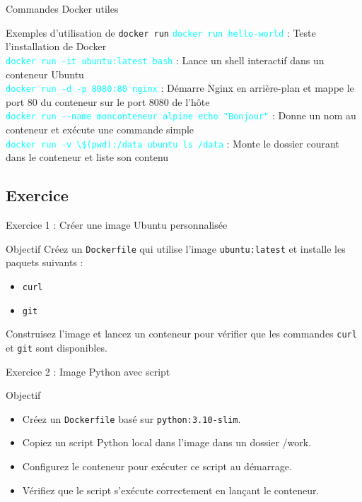 \documentclass{beamer}
\begin{document}
\begin{frame}[fragile]{Commandes Docker utiles}
\begin{block}{Exemples d'utilisation de \texttt{docker run}}
\textcolor{cyan}{\verb?docker run hello-world?} : Teste l'installation de Docker \\
\textcolor{cyan}{\verb?docker run -it ubuntu:latest bash?} : Lance un shell interactif dans un conteneur Ubuntu \\
\textcolor{cyan}{\verb?docker run -d -p 8080:80 nginx?} : Démarre Nginx en arrière-plan et mappe le port 80 du conteneur sur le port 8080 de l'hôte \\
\textcolor{cyan}{\verb?docker run --name monconteneur alpine echo "Bonjour"?} : Donne un nom au conteneur et exécute une commande simple \\
\textcolor{cyan}{\verb?docker run -v \$(pwd):/data ubuntu ls /data?} : Monte le dossier courant dans le conteneur et liste son contenu \\
\end{block}
\end{frame}


\subsection{Exercice}

\begin{frame}{Exercice 1 : Créer une image Ubuntu personnalisée}
\begin{block}{Objectif}
Créez un \texttt{Dockerfile} qui utilise l'image \texttt{ubuntu:latest} et installe les paquets suivants :
\begin{itemize}
  \item \texttt{curl}
  \item \texttt{git}
\end{itemize}
Construisez l'image et lancez un conteneur pour vérifier que les commandes \texttt{curl} et \texttt{git} sont disponibles.
\end{block}
\end{frame}

\begin{frame}{Exercice 2 : Image Python avec script}
\begin{block}{Objectif}
\begin{itemize}
  \item Créez un \texttt{Dockerfile} basé sur \texttt{python:3.10-slim}.
  \item Copiez un script Python local dans l'image dans un dossier /work.
  \item Configurez le conteneur pour exécuter ce script au démarrage.
  \item Vérifiez que le script s'exécute correctement en lançant le conteneur.
\end{itemize}
\end{block}
\end{frame}
\end{document}
